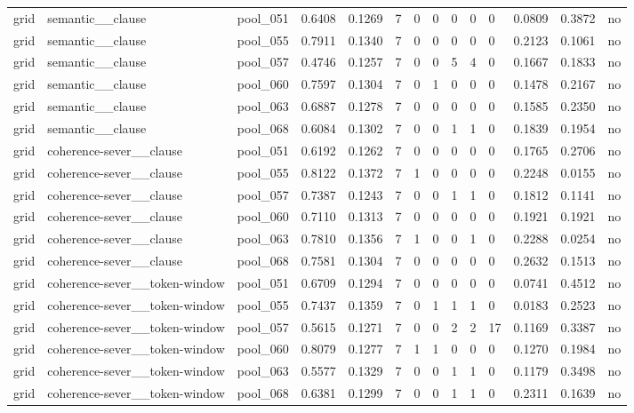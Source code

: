 \begin{table}[t]
{\begin{tabular}{llllllllllllll}
grid & semantic\_\_clause & pool\_051 & 0.6408 & 0.1269 & 7 & 0 & 0 & 0 & 0 & 0 & 0.0809 & 0.3872 & no \\
grid & semantic\_\_clause & pool\_055 & 0.7911 & 0.1340 & 7 & 0 & 0 & 0 & 0 & 0 & 0.2123 & 0.1061 & no \\
grid & semantic\_\_clause & pool\_057 & 0.4746 & 0.1257 & 7 & 0 & 0 & 5 & 4 & 0 & 0.1667 & 0.1833 & no \\
grid & semantic\_\_clause & pool\_060 & 0.7597 & 0.1304 & 7 & 0 & 1 & 0 & 0 & 0 & 0.1478 & 0.2167 & no \\
grid & semantic\_\_clause & pool\_063 & 0.6887 & 0.1278 & 7 & 0 & 0 & 0 & 0 & 0 & 0.1585 & 0.2350 & no \\
grid & semantic\_\_clause & pool\_068 & 0.6084 & 0.1302 & 7 & 0 & 0 & 1 & 1 & 0 & 0.1839 & 0.1954 & no \\
grid & coherence-sever\_\_clause & pool\_051 & 0.6192 & 0.1262 & 7 & 0 & 0 & 0 & 0 & 0 & 0.1765 & 0.2706 & no \\
grid & coherence-sever\_\_clause & pool\_055 & 0.8122 & 0.1372 & 7 & 1 & 0 & 0 & 0 & 0 & 0.2248 & 0.0155 & no \\
grid & coherence-sever\_\_clause & pool\_057 & 0.7387 & 0.1243 & 7 & 0 & 0 & 1 & 1 & 0 & 0.1812 & 0.1141 & no \\
grid & coherence-sever\_\_clause & pool\_060 & 0.7110 & 0.1313 & 7 & 0 & 0 & 0 & 0 & 0 & 0.1921 & 0.1921 & no \\
grid & coherence-sever\_\_clause & pool\_063 & 0.7810 & 0.1356 & 7 & 1 & 0 & 0 & 1 & 0 & 0.2288 & 0.0254 & no \\
grid & coherence-sever\_\_clause & pool\_068 & 0.7581 & 0.1304 & 7 & 0 & 0 & 0 & 0 & 0 & 0.2632 & 0.1513 & no \\
grid & coherence-sever\_\_token-window & pool\_051 & 0.6709 & 0.1294 & 7 & 0 & 0 & 0 & 0 & 0 & 0.0741 & 0.4512 & no \\
grid & coherence-sever\_\_token-window & pool\_055 & 0.7437 & 0.1359 & 7 & 0 & 1 & 1 & 1 & 0 & 0.0183 & 0.2523 & no \\
grid & coherence-sever\_\_token-window & pool\_057 & 0.5615 & 0.1271 & 7 & 0 & 0 & 2 & 2 & 17 & 0.1169 & 0.3387 & no \\
grid & coherence-sever\_\_token-window & pool\_060 & 0.8079 & 0.1277 & 7 & 1 & 1 & 0 & 0 & 0 & 0.1270 & 0.1984 & no \\
grid & coherence-sever\_\_token-window & pool\_063 & 0.5577 & 0.1329 & 7 & 0 & 0 & 1 & 1 & 0 & 0.1179 & 0.3498 & no \\
grid & coherence-sever\_\_token-window & pool\_068 & 0.6381 & 0.1299 & 7 & 0 & 0 & 1 & 1 & 0 & 0.2311 & 0.1639 & no \\

\end{tabular}}
\end{table}
